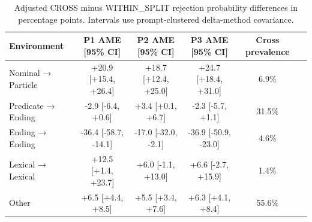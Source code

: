 \begin{table}[t]
\centering
\small
\begin{tabular}{lccccl}
\toprule
Environment & P1 AME [95\% CI] & P2 AME [95\% CI] & P3 AME [95\% CI] & Cross prevalence \\
\midrule
Nominal → Particle & +20.9 [+15.4, +26.4] & +18.7 [+12.4, +25.0] & +24.7 [+18.4, +31.0] & 6.9\% \\
Predicate → Ending & -2.9 [-6.4, +0.6] & +3.4 [+0.1, +6.7] & -2.3 [-5.7, +1.1] & 31.5\% \\
Ending → Ending & -36.4 [-58.7, -14.1] & -17.0 [-32.0, -2.1] & -36.9 [-50.9, -23.0] & 4.6\% \\
Lexical → Lexical & +12.5 [+1.4, +23.7] & +6.0 [-1.1, +13.0] & +6.6 [-2.7, +15.9] & 1.4\% \\
Other & +6.5 [+4.4, +8.5] & +5.5 [+3.4, +7.6] & +6.3 [+4.1, +8.4] & 55.6\% \\
\bottomrule
\end{tabular}
\caption{Adjusted CROSS minus WITHIN\_SPLIT rejection probability differences in percentage points. Intervals use prompt-clustered delta-method covariance.}
\label{tab:h3-environment-ame}
\end{table}
